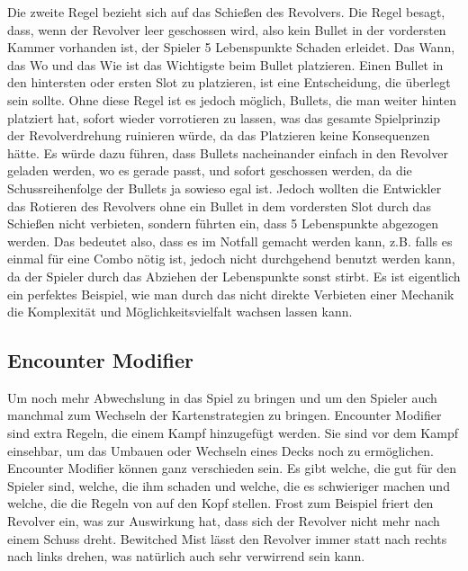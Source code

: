 Die zweite Regel bezieht sich auf das Schießen des Revolvers.
Die Regel besagt, dass, wenn der Revolver leer geschossen wird, also kein Bullet in der vordersten Kammer vorhanden ist,
der Spieler 5 Lebenspunkte Schaden erleidet. Das Wann, das Wo und das Wie ist das Wichtigste beim Bullet platzieren.
Einen Bullet in den hintersten oder ersten Slot zu platzieren, ist eine Entscheidung, die überlegt sein sollte.
Ohne diese Regel ist es jedoch möglich, Bullets, die man weiter hinten platziert hat, sofort wieder vorrotieren zu lassen,
was das gesamte Spielprinzip der Revolverdrehung ruinieren würde, da das Platzieren keine Konsequenzen hätte.
Es würde dazu führen, dass Bullets nacheinander einfach in den Revolver geladen werden, wo es gerade passt, und sofort
geschossen werden, da die Schussreihenfolge der Bullets ja sowieso egal ist. Jedoch wollten die Entwickler das Rotieren
des Revolvers ohne ein Bullet in dem vordersten Slot durch das Schießen nicht verbieten, sondern führten ein,
dass 5 Lebenspunkte abgezogen werden. Das bedeutet also, dass es im Notfall gemacht werden kann, z.B. falls es einmal für
eine Combo nötig ist, jedoch nicht durchgehend benutzt werden kann, da der Spieler durch das Abziehen der Lebenspunkte sonst stirbt.
Es ist eigentlich ein perfektes Beispiel, wie man durch das nicht direkte Verbieten einer Mechanik die Komplexität und
Möglichkeitsvielfalt wachsen lassen kann.


\subsection{Encounter Modifier}\label{encounter_modifier}

Um noch mehr Abwechslung in das Spiel zu bringen und um den Spieler auch manchmal zum Wechseln der Kartenstrategien zu bringen.
Encounter Modifier sind extra Regeln, die einem Kampf hinzugefügt werden.
Sie sind vor dem Kampf einsehbar, um das Umbauen oder Wechseln eines Decks noch zu ermöglichen.
Encounter Modifier können ganz verschieden sein.
Es gibt welche, die gut für den Spieler sind, welche, die ihm schaden und welche, die es schwieriger machen und welche, die die Regeln von \FF auf den Kopf stellen.
Frost zum Beispiel friert den Revolver ein, was zur Auswirkung hat, dass sich der Revolver nicht mehr nach einem Schuss dreht.
Bewitched Mist lässt den Revolver immer statt nach rechts nach links drehen, was natürlich auch sehr verwirrend sein kann.




\renewcommand{\kapitelautor}{}
